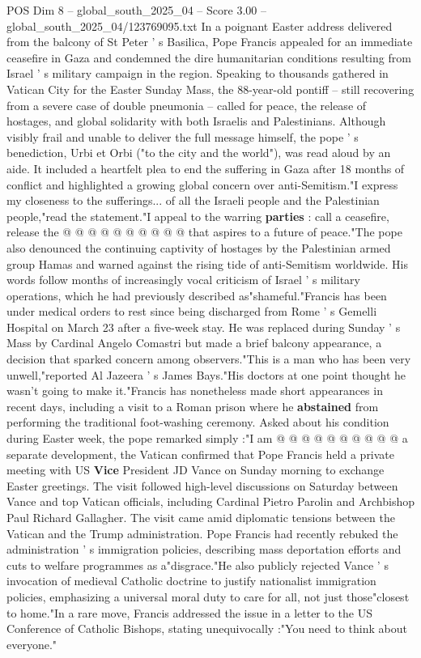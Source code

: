 \begin{textsample}{POS Dim 8 – global\_south\_2025\_04 – Score 3.00 – global\_south\_2025\_04/123769095.txt}  \label{ex:f8_pos_417}
In a poignant Easter address delivered from the balcony of St Peter ' s Basilica, Pope Francis appealed for an immediate ceasefire in Gaza and condemned the dire humanitarian conditions resulting from Israel ' s military campaign in the region.
Speaking to thousands gathered in Vatican City for the Easter Sunday Mass, the 88-year-old pontiff -- still recovering from a severe case of double pneumonia -- called for peace, the release of hostages, and global solidarity with both Israelis and Palestinians.
Although visibly frail and unable to deliver the full message himself, the pope ' s benediction, Urbi et Orbi ("to the city and the world"), was read aloud by an aide.
It included a heartfelt plea to end the suffering in Gaza after 18 months of conflict and highlighted a growing global concern over anti-Semitism."I express my closeness to the sufferings... of all the Israeli people and the Palestinian people,"read the statement."I appeal to the warring \textbf{parties} : call a ceasefire, release the @ @ @ @ @ @ @ @ @ @ that aspires to a future of peace."The pope also denounced the continuing captivity of hostages by the Palestinian armed group Hamas and warned against the rising tide of anti-Semitism worldwide.
His words follow months of increasingly vocal criticism of Israel ' s military operations, which he had previously described as"shameful."Francis has been under medical orders to rest since being discharged from Rome ' s Gemelli Hospital on March 23 after a five-week stay.
He was replaced during Sunday ' s Mass by Cardinal Angelo Comastri but made a brief balcony appearance, a decision that sparked concern among observers."This is a man who has been very unwell,"reported Al Jazeera ' s James Bays."His doctors at one point thought he wasn't going to make it."Francis has nonetheless made short appearances in recent days, including a visit to a Roman prison where he \textbf{abstained} from performing the traditional foot-washing ceremony.
Asked about his condition during Easter week, the pope remarked simply :"I am @ @ @ @ @ @ @ @ @ @ a separate development, the Vatican confirmed that Pope Francis held a private meeting with US \textbf{Vice} President JD Vance on Sunday morning to exchange Easter greetings.
The visit followed high-level discussions on Saturday between Vance and top Vatican officials, including Cardinal Pietro Parolin and Archbishop Paul Richard Gallagher.
The visit came amid diplomatic tensions between the Vatican and the Trump administration.
Pope Francis had recently rebuked the administration ' s immigration policies, describing mass deportation efforts and cuts to welfare programmes as a"disgrace."He also publicly rejected Vance ' s invocation of medieval Catholic doctrine to justify nationalist immigration policies, emphasizing a universal moral duty to care for all, not just those"closest to home."In a rare move, Francis addressed the issue in a letter to the US Conference of Catholic Bishops, stating unequivocally :"You need to think about everyone."

\end{textsample}
